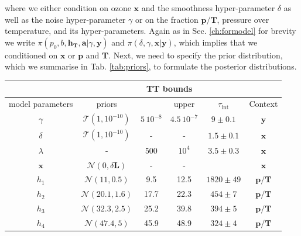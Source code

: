 where we either condition on ozone $\bm{x}$ and the smoothness hyper-parameter $\delta$ as well as the noise hyper-parameter $\gamma$ or on the fraction $\bm{p}/\bm{T}$, pressure over temperature, and its hyper-parameters.
Again as in Sec. \ref{ch:formodel} for brevity we write $\pi(p_0,b,\bm{h_T},\bm{a}| \gamma,\bm{y}) $ and $\pi(\delta, \gamma, \bm{x}|\bm{y})$, which implies that we conditioned on $\bm{x}$ or $\bm{p}$ and $\bm{T}$. 
Next, we need to specify the prior distribution, which we summarise in Tab. \ref{tab:priors}, to formulate the posterior distributions.
\begin{table}
	\centering
	\begin{tabular}{ |c||c|c|c|c|c|   }
		\hline
		& &\multicolumn{2}{|c|}{TT bounds}& &\\
		\hline
		model parameters& priors&\makecell{lower}& \makecell{upper\\
		}&$\tau_{\text{int}}$&Context\\
		\hhline{|=||=|=|=|=|=|}
		$\gamma$ & $\mathcal{T}(1,10^{-10})$ &$5 \, 10^{-8}$ &$4.5 \, 10^{-7}$&  $ 9\pm 0.1$ &$\bm{y}$\\ \hline
		$\delta$ &$\mathcal{T}(1,10^{-10})$ & -&-& $1.5 \pm 0.1$ & $\bm{x}$\\ \hline
		$\lambda$ &- & 500&$10^4$& $3.5 \pm 0.3$ &$\bm{x}$\\ \hline
		$\bm{x}$ &$\mathcal{N}(0,\delta \bm{L})$ & -&-&& $\bm{x}$\\ \hhline{|=||=|=|=|=|=|}
		$h_{1}$ &  $\mathcal{N}(11,0.5)$&9.5 &12.5&$1820 \pm 49$ &$\bm{p/T}$\\ \hline
		$h_{2}$ &  $\mathcal{N}(20.1,1.6)$&17.7 &22.3&$454 \pm 7$&$\bm{p/T}$\\ \hline
		$h_{3}$ &  $\mathcal{N}(32.3,2.5)$&25.2&39.8&$394 \pm 5$&$\bm{p/T}$\\ \hline
		$h_{4}$ &  $\mathcal{N}(47.4,5)$&45.9 &48.9&$324 \pm 4$&$\bm{p/T}$\\ \hline

\end{tabular}
\end{table}
